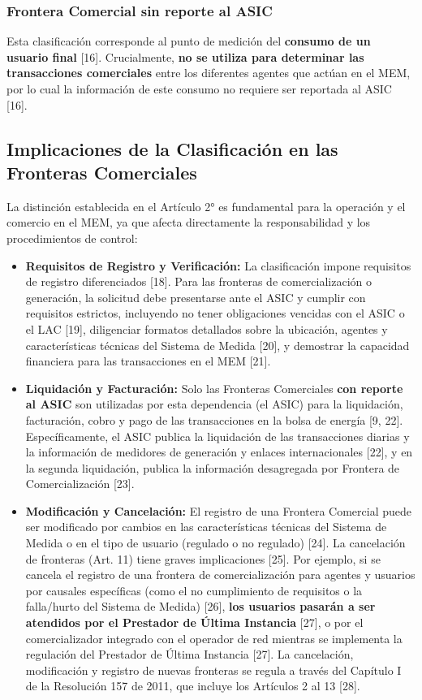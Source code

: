 \documentclass[a5paper]{book}%
\begin{document}
\subsubsection{Frontera Comercial sin reporte al ASIC}

Esta clasificación corresponde al punto de medición del \textbf{consumo de un usuario final} [16]. Crucialmente, \textbf{no se utiliza para determinar las transacciones comerciales} entre los diferentes agentes que actúan en el MEM, por lo cual la información de este consumo no requiere ser reportada al ASIC [16].

\subsection{Implicaciones de la Clasificación en las Fronteras Comerciales}

La distinción establecida en el Artículo 2° es fundamental para la operación y el comercio en el MEM, ya que afecta directamente la responsabilidad y los procedimientos de control:

\begin{itemize}
	\item \textbf{Requisitos de Registro y Verificación:} La clasificación impone requisitos de registro diferenciados [18]. Para las fronteras de comercialización o generación, la solicitud debe presentarse ante el ASIC y cumplir con requisitos estrictos, incluyendo no tener obligaciones vencidas con el ASIC o el LAC [19], diligenciar formatos detallados sobre la ubicación, agentes y características técnicas del Sistema de Medida [20], y demostrar la capacidad financiera para las transacciones en el MEM [21].
	\item \textbf{Liquidación y Facturación:} Solo las Fronteras Comerciales \textbf{con reporte al ASIC} son utilizadas por esta dependencia (el ASIC) para la liquidación, facturación, cobro y pago de las transacciones en la bolsa de energía [9, 22]. Específicamente, el ASIC publica la liquidación de las transacciones diarias y la información de medidores de generación y enlaces internacionales [22], y en la segunda liquidación, publica la información desagregada por Frontera de Comercialización [23].
	\item \textbf{Modificación y Cancelación:} El registro de una Frontera Comercial puede ser modificado por cambios en las características técnicas del Sistema de Medida o en el tipo de usuario (regulado o no regulado) [24]. La cancelación de fronteras (Art. 11) tiene graves implicaciones [25]. Por ejemplo, si se cancela el registro de una frontera de comercialización para agentes y usuarios por causales específicas (como el no cumplimiento de requisitos o la falla/hurto del Sistema de Medida) [26], \textbf{los usuarios pasarán a ser atendidos por el Prestador de Última Instancia} [27], o por el comercializador integrado con el operador de red mientras se implementa la regulación del Prestador de Última Instancia [27]. La cancelación, modificación y registro de nuevas fronteras se regula a través del Capítulo I de la Resolución 157 de 2011, que incluye los Artículos 2 al 13 [28].
\end{itemize}
  
\end{document}
